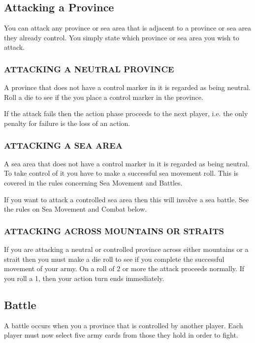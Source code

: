 \subsection{Attacking a Province}

You can attack any province or sea area that is adjacent to a province or sea area they already control. You simply state which province or sea area you wish to attack.

\subsubsection{ATTACKING A NEUTRAL PROVINCE}

A province that does not have a control marker in it is regarded as being neutral. Roll a die to see if the you place a control marker in the province.

If the attack fails then the action phase proceeds to the next player, i.e. the only penalty for failure is the loss of an action.

\subsubsection{ATTACKING A SEA AREA}

A sea area that does not have a control marker in it is regarded as being neutral. To take control of it you have to make a successful sea movement roll. This is covered in the rules concerning Sea Movement and Battles.

If you want to attack a controlled sea area then this will involve a sea battle. See the rules on Sea Movement and Combat below.

\subsubsection{ATTACKING ACROSS MOUNTAINS OR STRAITS}

If you are attacking a neutral or controlled province across either mountains or a strait then you must make a die roll to see if you complete the successful movement of your army. On a roll of 2 or more the attack proceeds normally. If you roll a 1, then your action turn ends immediately.

\subsection{Battle}

A battle occurs when you a province that is controlled by another player. Each player must now select five army cards from those they hold in order to fight.


